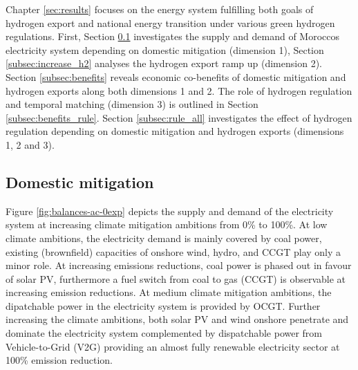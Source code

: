 Chapter \ref{sec:results} focuses on the energy system fulfilling both goals of hydrogen export and national energy transition under various green hydrogen regulations. First, Section \ref{subsec:increase_limit} investigates the supply and demand of Moroccos electricity system depending on domestic mitigation (dimension 1), Section \ref{subsec:increase_h2} analyses the hydrogen export ramp up (dimension 2). Section \ref{subsec:benefits} reveals economic co-benefits of domestic mitigation and hydrogen exports along both dimensions 1 and 2. The role of hydrogen regulation and temporal matching (dimension 3) is outlined in Section \ref{subsec:benefits_rule}. Section \ref{subsec:rule_all} investigates the effect of hydrogen regulation depending on domestic mitigation and hydrogen exports (dimensions 1, 2 and 3).






\subsection{Domestic mitigation}
\label{subsec:increase_limit}
Figure \ref{fig:balances-ac-0exp} depicts the supply and demand of the electricity system at increasing climate mitigation ambitions from 0\% to 100\%. At low climate ambitions, the electricity demand is mainly covered by coal power, existing (brownfield) capacities of onshore wind, hydro, and CCGT play only a minor role. 
At increasing emissions reductions, coal power is phased out in favour of solar PV, furthermore a fuel switch from coal to gas (CCGT) is observable at increasing emission reductions. At medium climate mitigation ambitions, the dipatchable power in the electricity system is provided by OCGT. 
Further increasing the climate ambitions, both solar PV and wind onshore penetrate and dominate the electricity system complemented by dispatchable power from Vehicle-to-Grid (V2G) providing an almost fully renewable electricity sector at 100\% emission reduction. 

